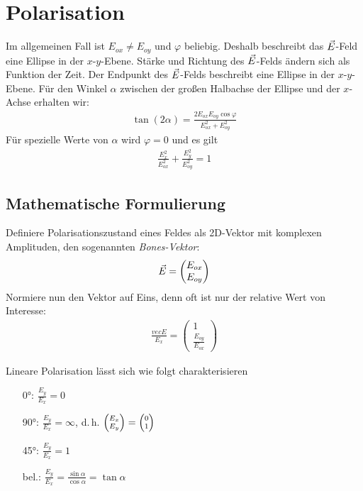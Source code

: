 \chapter{Polarisation}

Im allgemeinen Fall ist $E_{ox}\neq E_{oy}$ und $\varphi$
beliebig. Deshalb beschreibt das $\vec{E}$-Feld eine Ellipse in der
$x$-$y$-Ebene. Stärke und Richtung des $\vec{E}$-Felds ändern sich als
Funktion der Zeit. Der Endpunkt des $\vec{E}$-Felds beschreibt eine
Ellipse in der $x$-$y$-Ebene. Für den Winkel $\alpha$ zwischen der
großen Halbachse der Ellipse und der $x$-Achse erhalten wir:
\begin{gather*}
  \tan(2\alpha) 
  = \frac{2E_{ox}E_{oy}\cos\varphi}{E_{ox}^2 + E_{oy}^2}
\end{gather*}
Für spezielle Werte von $\alpha$ wird $\varphi = 0$ und es gilt
\begin{gather*}
  \frac{E_x^2}{E_{ox}^2} + \frac{E_y^2}{E_{oy}^2} = 1
\end{gather*}

\section{Mathematische Formulierung}
Definiere Polarisationszustand eines Feldes als 2D-Vektor mit
komplexen Amplituden, den sogenannten
\emph{Bones-Vektor}:
\begin{gather*}
  \vec{E} = \begin{pmatrix}E_{ox}\\E_{oy}\end{pmatrix}
\end{gather*}
Normiere nun den Vektor auf Eins, denn oft ist nur der relative Wert
von Interesse:
\begin{gather*}
  \frac{vecE}{E_x} 
  = \begin{pmatrix}
    1\\\frac{E_{oy}}{E_{ox}}
  \end{pmatrix}
\end{gather*}

Lineare Polarisation lässt sich wie folgt charakterisieren
\begin{itemize}
\item[\ang{0}:] $\frac{E_y}{E_x} = 0$
\item[\ang{90}:] $\frac{E_y}{E_x} = \infty$, d.\,h.
$\scriptsize\begin{pmatrix}E_x\\E_y\end{pmatrix}
= \begin{pmatrix}0\\1\end{pmatrix}$
\item[\ang{45}:] $\frac{E_y}{E_x} = 1$
\item[bel.:] 
  $\frac{E_y}{E_x} = \frac{\sin\alpha}{\cos\alpha} = \tan\alpha$
\end{itemize}


